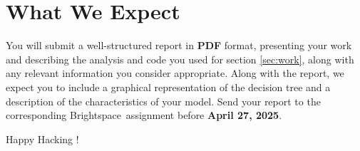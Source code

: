 \documentclass{article}
\begin{document}
\section{What We Expect}
You will submit a well-structured report in \textbf{PDF} format, presenting your work and describing the analysis and code you used for section \ref{sec:work}, along with any relevant information you consider appropriate. Along with the report, we expect you to include a graphical representation of the decision tree and a description of the characteristics of your model. Send your report to the corresponding Brightspace\texttrademark ~assignment before \textbf{April 27, 2025}.

\vspace{5mm}
Happy Hacking !
\end{document}
